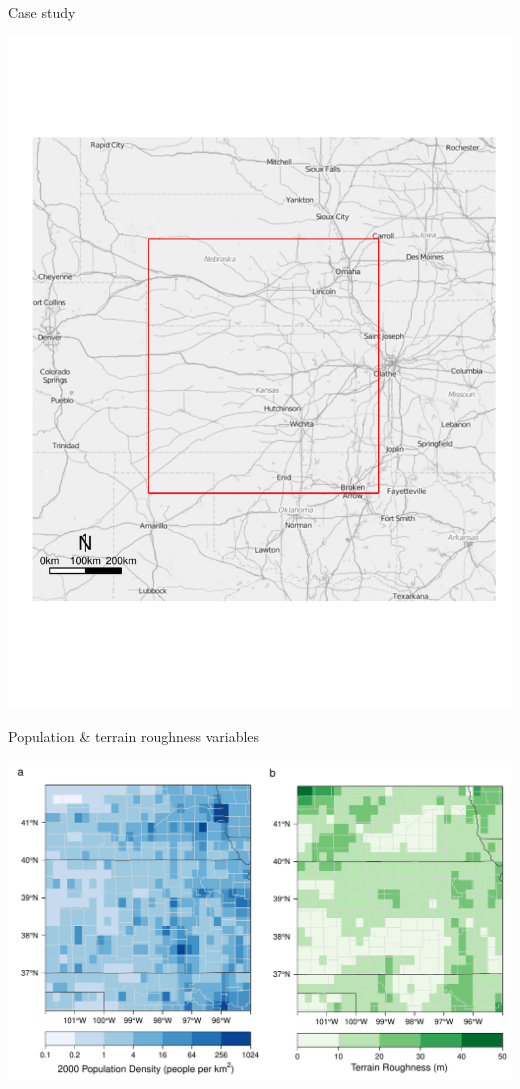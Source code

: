 \documentclass[handout]{beamer}
\begin{document}
\begin{frame}{Case study}
\vspace{-1cm}
\begin{center}
\includegraphics[scale=.48]{figures/DomainMap.pdf}
\end{center}
\end{frame}

\begin{frame}{Population \& terrain roughness variables}
\vspace{-1cm}
\begin{center}
\includegraphics[scale=.4]{figures/PopTRMap.pdf}
\end{center}
\end{frame}
\end{document}
